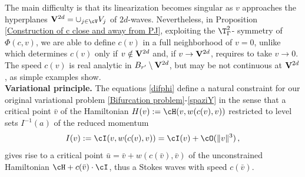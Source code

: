 \documentclass[11pt,a4paper,reqno]{article}
\numberwithin{equation}{section}
\theoremstyle{definition}
\begin{document}
The main difficulty 
is that 
its linearization   becomes singular as $ v $ approaches the 
hyperplanes 
$ {\bf V}^{2d} = \cup_{j \in \cV} V_j $
of $ 2 d $-waves. Nevertheless, in Proposition 
\ref{Construction of c close and away from PJ},  exploiting the 
$\T^2_\Gamma $- symmetry of $ \Phi(c, v) $, we are able to define $ c(v) $ 
in a full neighborhood of $ v = 0 $,  
unlike  \cite{CN} which determines $ c(v) $ only  if $ v \notin {\bf V}^{2d} $ 
and, if $ v \to 
{\bf V}^{2d} $, requires to take  $ v \to 0 $. 
  The speed  $c (v) $
  is real analytic 
  in $ B_{r'} \setminus {\bf V}^{2d} $, 
  but 
  may  be not continuous at $ {\bf V}^{2d} $, as simple examples show. 
\\[1mm]
{\bf Variational principle.}
The equations \eqref{difphi} define a natural constraint for our original variational 
problem \eqref{Bifurcation problem}-\eqref{spaziY} in the sense that 
 a critical point $ \bar v $ of  the 
Hamiltonian
$ 
H(v) := \cH (v, w(c(v),v)) $
restricted to level sets 
$ I^{-1}(a) 
$ %
of the  reduced momentum 
\begin{equation}\label{redmo}
I(v)  := \cI (v, w(c(v),v)) = \cI (v) + \cO(\| v \|^3 ) 
\, ,
\end{equation}
gives rise to a  critical point $  \bar u = \bar v + w(c(\bar v), \bar v)$ of the unconstrained  Hamiltonian $ \cH + c (\bar v) \cdot 
\cI $, thus a Stokes waves with speed $ c(\bar v)$.
\end{document}

